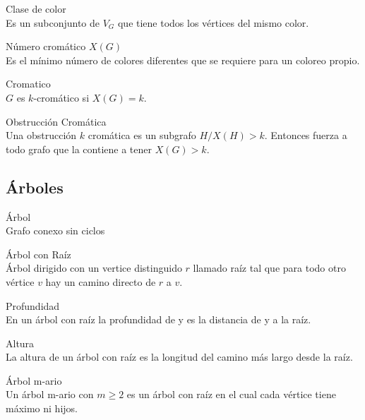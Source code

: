 \documentclass{article}
\begin{document}
\begin{defn}
Clase de color \\ Es un subconjunto de $V_{G}$ que tiene todos los vértices del mismo color.
\end{defn}

\begin{defn}
Número cromático $X(G)$ \\ Es el mínimo número de colores diferentes que se requiere para un coloreo propio.
\end{defn}

\begin{defn}
Cromatico \\ $G$ es $k$-cromático si $X(G)=k$.
\end{defn}

\begin{defn}
Obstrucción Cromática \\ Una obstrucción $k$ cromática es un subgrafo $H / X(H)>k$. Entonces fuerza a todo grafo que la contiene a tener $X(G)>k$.
\end{defn}

\subsection{Árboles}

\begin{defn}
Árbol \\ Grafo conexo sin ciclos
\end{defn}

\begin{defn}
Árbol con Raíz \\ Árbol dirigido con un vertice distinguido $r$ llamado raíz tal que para todo otro vértice $v$ hay un camino directo de $r$ a $v$.
\end{defn}

\begin{defn}
Profundidad \\ En un árbol con raíz la profundidad de y es la distancia de y a la raíz.
\end{defn}

\begin{defn}
Altura \\ La altura de un árbol con raíz es la longitud del camino más largo desde la raíz.
\end{defn}

\begin{defn}
Árbol m-ario \\ Un árbol m-ario con $m\geq2$ es un árbol con raíz en el cual cada vértice tiene máximo ni hijos. 
\end{defn}
\end{document}
